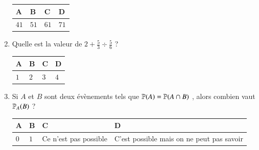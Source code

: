 \documentclass[oneside,12pt]{exam}          %
\begin{document}
\begin{enumerate}[label=\underline{Question \no\arabic*} :  , leftmargin=* , itemsep=4mm]
		\hspace{\linewidth-\textwidth}
		\renewcommand{\arraystretch}{1.5}
		\begin{tabular}{| P{0.22\textwidth} | P{0.22\textwidth} | P{0.22\textwidth} | P{0.22\textwidth} |} \hline
			A & B & C & D \\ \hline
			$41$ & $51$ & $61$ & $71$ \\ \hline
		\end{tabular}
		
		

	\item Quelle est la valeur de $2 + \frac{5}{3} \div \frac{5}{6} $ ?
	
		\hspace{\linewidth-\textwidth}
		\renewcommand{\arraystretch}{1.5}
		\begin{tabular}{| P{0.22\textwidth} | P{0.22\textwidth} | P{0.22\textwidth} | P{0.22\textwidth} |} \hline
			A & B & C & D \\ \hline
			$1$ & $2$ & $3$ & $4$ \\ \hline
		\end{tabular}
		
		

	\item Si $A$ et $B$ sont deux évènements tels que ${\mathbb P}(A) = {\mathbb P}(A \cap B)$ , alors combien vaut ${\mathbb P}_A(B)$ ?
	
		\hspace{\linewidth-\textwidth}
		\renewcommand{\arraystretch}{1.5}
		\begin{tabular}{| P{0.22\textwidth} | P{0.22\textwidth} | P{0.22\textwidth} | P{0.22\textwidth} |} \hline
			A & B & C & D \\ \hline
			$0$ & $1$ & Ce n'est pas possible & C'est possible mais on ne peut pas savoir \\ \hline
		\end{tabular}	
		
\end{enumerate}
\end{document}
